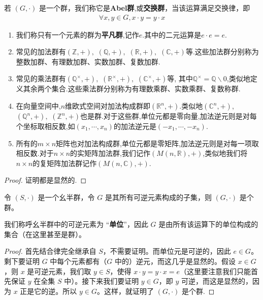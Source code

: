 \documentclass[../../main.tex]{subfiles}
\begin{document}
\begin{definition}[Abel群]
若 $(G, \cdot)$ 是一个群，我们称它是\textbf{Abel群},或\textbf{交换群}，当该运算满足交换律，即
\begin{align*}
\forall x, y \in G, x \cdot y = y \cdot x
\end{align*} 
\end{definition}

\begin{example}[$\,\,$常见的群]
\begin{enumerate}
\item 我们称只有一个元素的群为\textbf{平凡群},记作${e}$.其中的二元运算是$e\cdot e=e$.
\item 常见的加法群有$(\mathbb{Z},+),$ $(\mathbb{Q},+),$ $(\mathbb{R},+),$ $(\mathbb{C},+)$等.这些加法群分别称为整数加群、有理数加群、实数加群、复数加群.
\item 常见的乘法群有$(\mathbb{Q}^\times,+),$ $(\mathbb{R}^\times,+),$ $(\mathbb{C}^\times,+)$等, 其中$\mathbb{Q}^\times=\mathbb{Q}\backslash {0}$,类似地定义其余两个集合.这些乘法群分别称为有理数乘群、实数乘群、复数称群.
\item 在向量空间中,$n$维欧式空间对加法构成群即$(\mathbb{R}^n,+)$.类似地$(\mathbb{C}^n,+),$ $(\mathbb{Q}^n,+),$ $(\mathbb{Z}^n,+)$也是群.对于这些群,单位元都是零向量,加法逆元则是对每个坐标取相反数,如$(x_1,\cdots,x_n)$的加法逆元是$(-x_1,\cdots,-x_n)$.
\item 所有的$m\times n$矩阵也对加法构成群,单位元都是零矩阵,加法逆元则是对每一项取相反数.对于$n\times n$的实矩阵加法群,我们记作$(M(n,\mathbb{R}),+)$,类似地我们将$n\times n$的复矩阵加法群记作$(M(n,\mathbb{C}),+)$.
\end{enumerate}
\end{example}
\begin{proof}
证明都是显然的.
\end{proof}

\begin{lemma}\label{lemma:幺半群中所有可逆元构成了群}
令 $(S, \cdot)$ 是一个幺半群，令 $G$ 是其所有可逆元素构成的子集，则 $(G, \cdot)$ 是个群。
\end{lemma}
\begin{remark}
我们称呼幺半群中的可逆元素为 “\textbf{单位}”，因此 $G$ 是由所有该运算下的单位构成的集合（在这里甚至是群）。
\end{remark}
\begin{proof}
首先结合律完全继承自 $S$，不需要证明。而单位元是可逆的，因此 $e \in G$。剩下要证明 $G$ 中每个元素都有（$G$ 中的）逆元，而这几乎是显然的。假设 $x \in G$，则 $x$ 是可逆元素，我们取 $y \in S$，使得 $x \cdot y = y \cdot x = e$（这里要注意我们只能首先保证 $y$ 在全集 $S$ 中）。接下来我们要证明 $y \in G$，即 $y$ 可逆，而这是显然的，因为 $x$ 正是它的逆。所以 $y \in G$。这样，就证明了 $(G, \cdot)$ 是个群.
\end{proof}
\end{document}
